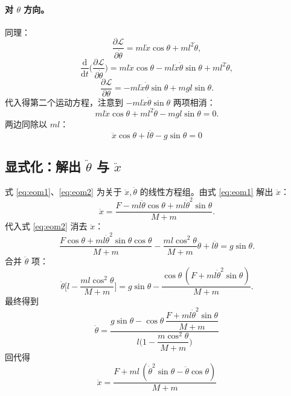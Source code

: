 \documentclass[11pt,a4paper]{article}
\begin{document}
\paragraph{对 \texorpdfstring{$\theta$}{θ} 方向。} 同理：
\begin{equation}
    \frac{\partial \mathcal L}{\partial \dot\theta} = ml\dot x\cos\theta + ml^2\dot\theta ,
\end{equation}
\begin{equation}
    \frac{\mathrm d}{\mathrm dt}\Big(\frac{\partial \mathcal L}{\partial \dot\theta}\Big)
    = ml\ddot x\cos\theta - ml\dot x\dot\theta\sin\theta + ml^2\ddot\theta ,
\end{equation}
\begin{equation}
    \frac{\partial \mathcal L}{\partial \theta} = -ml\dot x\dot\theta\sin\theta + mgl\sin\theta .
\end{equation}
代入得第二个运动方程，注意到 $-ml\dot x\dot\theta\sin\theta$ 两项相消：
\begin{equation}
    ml\ddot x\cos\theta + ml^2\ddot\theta - mgl\sin\theta = 0 .
\end{equation}
两边同除以 $ml$：
\begin{equation}
    \boxed{\; \ddot x\cos\theta + l\ddot\theta - g\sin\theta = 0 \;}
    \label{eq:eom2}
\end{equation}

\subsection{显式化：解出 \texorpdfstring{$\ddot\theta$}{θ̈} 与 \texorpdfstring{$\ddot x$}{ẍ}}

式 \eqref{eq:eom1}、\eqref{eq:eom2} 为关于 $\ddot x, \ddot\theta$ 的线性方程组。由式 \eqref{eq:eom1} 解出 $\ddot x$：
\begin{equation}
    \ddot x = \frac{F - ml\ddot\theta\cos\theta + ml\dot\theta^2\sin\theta}{M+m} .
\end{equation}
代入式 \eqref{eq:eom2} 消去 $\ddot x$：
\begin{equation}
    \frac{F\cos\theta + ml\dot\theta^2\sin\theta\cos\theta}{M+m}
    - \frac{ml\cos^2\theta}{M+m}\ddot\theta + l\ddot\theta = g\sin\theta .
\end{equation}
合并 $\ddot\theta$ 项：
\begin{equation}
    \ddot\theta\Big[ l - \frac{ml\cos^2\theta}{M+m}\Big]
    = g\sin\theta - \frac{\cos\theta\,(F + ml\dot\theta^2\sin\theta)}{M+m} .
\end{equation}
最终得到
\begin{equation}
\boxed{\;
    \ddot\theta = \frac{g\sin\theta - \cos\theta\,\dfrac{F + ml\dot\theta^2\sin\theta}{M+m}}
                     {l\Big(1 - \dfrac{m\cos^2\theta}{M+m}\Big)}
\;}
\label{eq:thetadd}
\end{equation}
回代得
\begin{equation}
\boxed{\;
    \ddot x = \frac{F + ml\,(\dot\theta^2\sin\theta - \ddot\theta\cos\theta)}{M+m}
\;}
\label{eq:xdd}
\end{equation}
\end{document}

